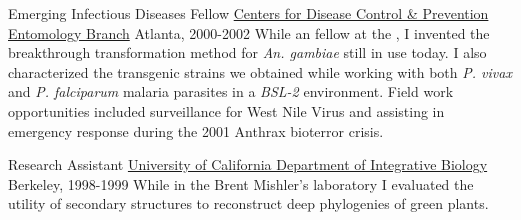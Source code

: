 \begin{cventries}
    \cventry
    	{Emerging Infectious Diseases Fellow}
    	{\href{http://www.cdc.gov/}{Centers for Disease Control \& Prevention \newline Entomology Branch}}
		{Atlanta, }
		{2000-2002}
    	{While an  fellow at the , I invented the breakthrough transformation method for \emph{An. gambiae} still in use today. I also characterized the transgenic strains we obtained while working with both \emph{P. vivax} and \emph{P. falciparum} malaria parasites in a \emph{BSL-2} environment. Field work opportunities included surveillance for West Nile Virus and assisting in  emergency response during the 2001 Anthrax bioterror crisis.}

	\cventry
		{Research Assistant}
		{\href{http://ib.berkeley.edu/}{University of California \newline Department of Integrative Biology}}
		{Berkeley, }
		{1998-1999}
		{While in the Brent Mishler's laboratory I evaluated the utility of  secondary structures to reconstruct deep phylogenies of green plants.}

\end{cventries}